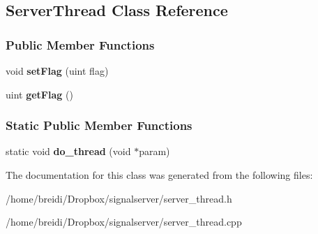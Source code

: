 \hypertarget{class_server_thread}{
\subsection{ServerThread Class Reference}
\label{class_server_thread}
}
\subsubsection*{Public Member Functions}
\begin{DoxyCompactItemize}
\item 
\hypertarget{class_server_thread_a59039240b6ca387b398c8fb481cca910}{
void {\bfseries setFlag} (uint flag)}
\label{class_server_thread_a59039240b6ca387b398c8fb481cca910}

\item 
\hypertarget{class_server_thread_a862fdcfd3dc5d4baa40ec65299e5b37c}{
uint {\bfseries getFlag} ()}
\label{class_server_thread_a862fdcfd3dc5d4baa40ec65299e5b37c}

\end{DoxyCompactItemize}
\subsubsection*{Static Public Member Functions}
\begin{DoxyCompactItemize}
\item 
\hypertarget{class_server_thread_ac0f5293ae279fa46a67d9a1cce92317b}{
static void {\bfseries do\_\-thread} (void $\ast$param)}
\label{class_server_thread_ac0f5293ae279fa46a67d9a1cce92317b}

\end{DoxyCompactItemize}


The documentation for this class was generated from the following files:\begin{DoxyCompactItemize}
\item 
/home/breidi/Dropbox/signalserver/server\_\-thread.h\item 
/home/breidi/Dropbox/signalserver/server\_\-thread.cpp\end{DoxyCompactItemize}

